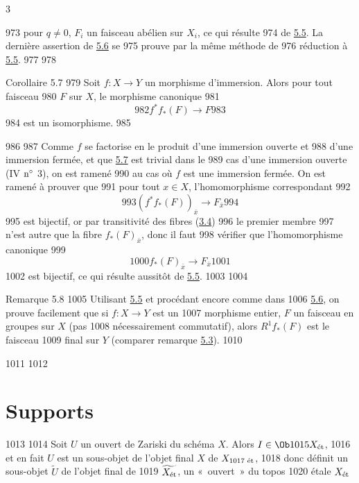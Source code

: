 3	\documentclass[10pt]{../fichiers-configuration-latex/smfart}
\begin{document}
   973	pour $q \neq 0$, $F_i$ un faisceau abélien sur $X_i$, ce qui résulte
   974	de \hyperref[VIII.prop5.5]{5.5}. La dernière assertion de \hyperref[VIII.cor5.6]{5.6} se
   975	prouve par la même méthode de
   976	réduction à \hyperref[VIII.prop5.5]{5.5}.
   977	
   978	\begin{enonce*}{Corollaire 5.7}
   979	Soit $f : X \to Y$ un morphisme d'immersion. Alors pour tout faisceau
   980	$F$ sur $X$, le morphisme canonique
   981	$$
   982	f^{\ast} f_{\ast} (F) \to F
   983	$$
   984	est un isomorphisme.
   985	\end{enonce*}
   986	
   987	Comme $f$ se factorise en le produit d'une immersion ouverte et
   988	d'une immersion fermée, et que \hyperref[VIII.cor5.7]{5.7} est trivial dans le
   989	cas d'une immersion ouverte (IV ${\rm n^{\circ}}$ 3), on est ramené
   990	au cas où $f$ est une immersion fermée. On est ramené à prouver que
   991	pour tout $x \in X$, l'homomorphisme correspondant
   992	$$
   993	(f^{\ast} f_{\ast}(F))_{\bar{x}} \to F_{\bar{x}}
   994	$$
   995	est bijectif, or par transitivité des fibres (\hyperref[VIII.subsec3.4]{3.4})
   996	le premier membre
   997	n'est autre que la fibre $f_{\ast} (F)_{\bar{x}}$, donc il faut
   998	vérifier que l'homomorphisme canonique
   999	$$
  1000	f_{\ast} (F)_{\bar{x}} \to F_{\bar{x}}
  1001	$$
  1002	est bijectif, ce qui résulte aussitôt de \hyperref[VIII.prop5.5]{5.5}.
  1003	
  1004	\begin{enonce*}[remark]{Remarque 5.8}
  1005	Utilisant \hyperref[VIII.prop5.5]{5.5} et procédant encore comme dans
  1006	\hyperref[VIII.cor5.6]{5.6}, on prouve facilement que si $f : X \to Y$ est un
  1007	morphisme entier, $F$ un faisceau en groupes sur $X$ (pas
  1008	nécessairement commutatif), alors $R^1 f_{\ast} (F)$ est le faisceau
  1009	final sur $Y$ (comparer remarque \hyperref[VIII.rem5.3]{5.3}).
  1010	\end{enonce*}
  1011	
  1012	\section{Supports}\pageoriginale{}
  1013	
  1014	Soit $U$ un ouvert de Zariski du schéma $X$. Alors $I \in \Ob
  1015	X_{\text{\rm ét}}$,
  1016	et en fait $U$ est un sous-objet de l'objet final $X$ de $X_{\text{\rm
  1017	    ét}}$,
  1018	donc définit un sous-objet $\widetilde{U}$ de l'objet final de
  1019	$\widetilde{X_{\text{\rm ét}}}$, \ie un « ouvert » du topos
  1020	étale $X_{\text{\rm ét}}$
\end{document}
